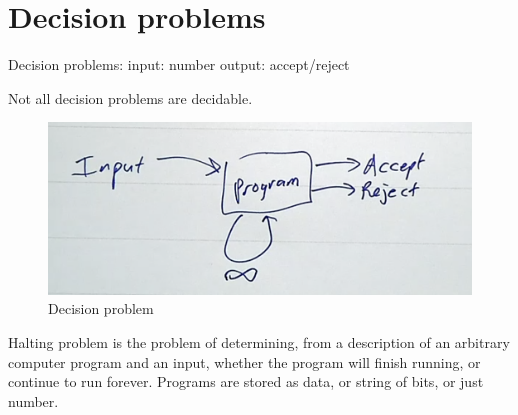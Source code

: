 \documentclass{article}
\begin{document}



\section{Decision problems} 

Decision problems:
input: number
output: accept/reject

Not all decision problems are decidable.
    \begin{figure}[h!]
		\begin{center}
			\includegraphics[scale=0.3]{fig1}
		\end{center}
		\caption{Decision problem}
	\end{figure}
Halting problem is the problem of determining, from a description of an arbitrary computer program and an input, whether the program will finish running, or continue to run forever.
Programs are stored as data, or string of bits, or just number.
\end{document}
